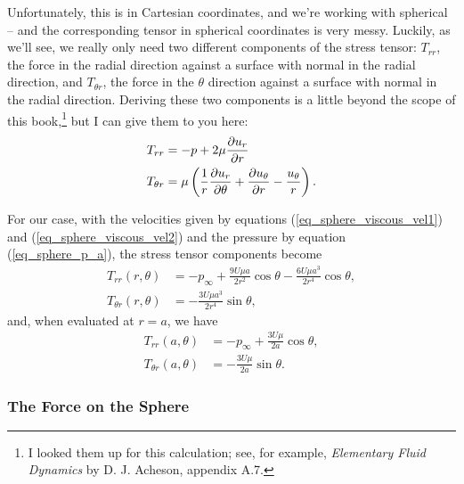 Unfortunately, this is in Cartesian coordinates, and we're working with spherical -- and the corresponding tensor in spherical coordinates is very messy.  Luckily, as we'll see, we really only need two different components of the stress tensor:  $T_{rr}$, the force in the radial direction against a surface with normal in the radial direction, and $T_{\theta r}$, the force in the $\unit{\theta}$ direction against a surface with normal in the radial direction.  Deriving these two components is a little beyond the scope of this book,\footnote{I looked them up for this calculation; see, for example, \emph{Elementary Fluid Dynamics} by D. J. Acheson, appendix A.7.} but I can give them to you here:
\begin{align}
T_{rr} & = -p + 2\mu \frac{\partial {u_r}}{\partial {r}} \\
T_{\theta r} & = \mu \left( \frac{1}{r} \frac{\partial {u_r}}{\partial {\theta}} + \frac{\partial {u_\theta}}{\partial {r}} - \frac{u_\theta}{r} \right).
\end{align}

For our case, with the velocities given by equations (\ref{eq_sphere_viscous_vel1}) and (\ref{eq_sphere_viscous_vel2}) and the pressure by equation (\ref{eq_sphere_p_a}), the stress tensor components become
\begin{align*}
T_{rr}(r, \theta) & = -p_\infty + \frac{9U \mu a}{2r^2} \cos\theta - \frac{6 U \mu a^3}{2r^4} \cos \theta, \\
T_{\theta r}(r, \theta) & = -\frac{3 U \mu a^3}{2r^4} \sin\theta,
\end{align*}
and, when evaluated at $r = a$, we have
\begin{align}
\label{eq_stress_rr}
T_{rr}(a, \theta) & = -p_\infty + \frac{3 U \mu}{2a} \cos \theta, \\
\label{eq_stress_thetar}
T_{\theta r}(a, \theta) & = -\frac{3 U \mu }{2a} \sin\theta.
\end{align}


\subsubsection{The Force on the Sphere}

